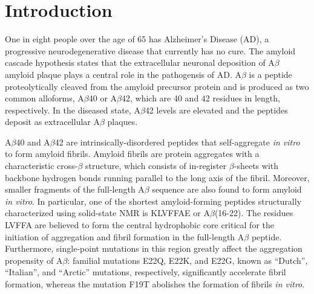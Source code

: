 \section{Introduction}
One in eight people over the age of 65 has Alzheimer's Disease (AD), a progressive neurodegenerative disease that currently has no cure.\cite{Citron:2010p214} The amyloid cascade hypothesis states that the extracellular neuronal deposition of A$\beta$ amyloid plaque plays a central role in the pathogensis of AD.\cite{Solomon:2010p177} A$\beta$ is a peptide proteolytically cleaved from the amyloid precursor protein and is produced as two common alloforms, A$\beta$40 or A$\beta$42, which are 40 and 42 residues in length, respectively. In the diseased state, A$\beta$42 levels are elevated and the peptides deposit as extracellular A$\beta$ plaques.\cite{Haass:2007p226,Westaway:1997p4185}

A$\beta$40 and A$\beta$42 are intrinsically-disordered peptides that self-aggregate \emph{in vitro} to form amyloid fibrils. Amyloid fibrils are protein aggregates with a characteristic cross-$\beta$ structure, which consists of in-register $\beta$-sheets with backbone hydrogen bonds running parallel to the long axis of the fibril.\cite{Petkova:2002p192} Moreover, smaller fragments of the full-length A$\beta$ sequence are also found to form amyloid \emph{in vitro}.\cite{Balbach:2000p49,Sawaya:2007p11} In particular, one of the shortest amyloid-forming peptides structurally characterized using solid-state NMR is KLVFFAE or A$\beta$(16-22).\cite{Balbach:2000p49} The residues LVFFA are believed to form the central hydrophobic core critical for the initiation of aggregation and fibril formation in the full-length A$\beta$ peptide.\cite{Wood:1995p190} Furthermore, single-point mutations in this region greatly affect the aggregation propensity of A$\beta$: familial mutations E22Q, E22K, and E22G, known as ``Dutch'', ``Italian'', and ``Arctic'' mutations, respectively, significantly accelerate fibril formation,\cite{Kim:2008ef} whereas the mutation F19T abolishes the formation of fibrils \emph{in vitro}.\cite{Esler:1996p288}

